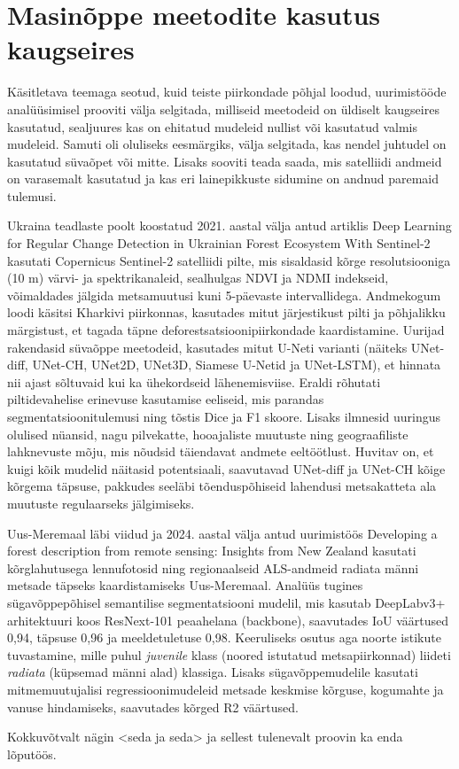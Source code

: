 \section{Masinõppe meetodite kasutus kaugseires}
Käsitletava teemaga seotud, kuid teiste piirkondade põhjal loodud, uurimistööde analüüsimisel prooviti välja selgitada, milliseid meetodeid on üldiselt kaugseires kasutatud, sealjuures kas on ehitatud mudeleid nullist või kasutatud
valmis mudeleid. Samuti oli oluliseks eesmärgiks, välja selgitada, kas nendel juhtudel on kasutatud süvaõpet või mitte. Lisaks sooviti teada saada, mis satelliidi andmeid on varasemalt kasutatud ja kas eri lainepikkuste sidumine on andnud paremaid tulemusi.

Ukraina teadlaste poolt koostatud 2021. aastal välja antud artiklis \glqq Deep Learning for Regular Change
Detection in Ukrainian Forest Ecosystem With Sentinel-2\grqq{} kasutati Copernicus Sentinel-2 satelliidi pilte, mis sisaldasid kõrge resolutsiooniga (10 m) värvi- ja spektrikanaleid, sealhulgas NDVI ja NDMI indekseid, võimaldades jälgida metsamuutusi kuni 5-päevaste intervallidega. Andmekogum loodi käsitsi Kharkivi piirkonnas, kasutades mitut järjestikust pilti ja põhjalikku märgistust, et tagada täpne deforestsatsioonipiirkondade kaardistamine. Uurijad rakendasid süvaõppe meetodeid, kasutades mitut U-Neti varianti (näiteks UNet-diff, UNet-CH, UNet2D, UNet3D, Siamese U-Netid ja UNet-LSTM), et hinnata nii ajast sõltuvaid kui ka ühekordseid lähenemisviise. Eraldi rõhutati piltidevahelise erinevuse kasutamise eeliseid, mis parandas segmentatsioonitulemusi ning tõstis Dice ja F1 skoore. Lisaks ilmnesid uuringus olulised nüansid, nagu pilvekatte, hooajaliste muutuste ning geograafiliste lahknevuste mõju, mis nõudsid täiendavat andmete eeltöötlust. Huvitav on, et kuigi kõik mudelid näitasid potentsiaali, saavutavad UNet-diff ja UNet-CH kõige kõrgema täpsuse, pakkudes seeläbi tõenduspõhiseid lahendusi metsakatteta ala muutuste regulaarseks jälgimiseks. \cite{isaienkovDeepLearningRegular2021}

Uus-Meremaal läbi viidud ja 2024. aastal välja antud uurimistöös \glqq Developing a forest description from remote sensing: Insights from
New Zealand\grqq{} kasutati kõrglahutusega lennufotosid ning regionaalseid ALS-andmeid radiata männi metsade täpseks kaardistamiseks Uus-Meremaal. Analüüs tugines sügavõppepõhisel semantilise segmentatsiooni mudelil, mis kasutab DeepLabv3+ arhitektuuri koos ResNext-101 peaahelana (backbone), saavutades IoU väärtused 0,94, täpsuse 0,96 ja meeldetuletuse 0,98. Keeruliseks osutus aga noorte istikute tuvastamine, mille puhul \textit{juvenile} klass (noored istutatud metsapiirkonnad) liideti \textit{radiata} (küpsemad männi alad) klassiga. Lisaks sügavõppemudelile kasutati mitmemuutujalisi regressioonimudeleid metsade keskmise kõrguse, kogumahte ja vanuse hindamiseks, saavutades kõrged R2 väärtused. \cite{pearseDevelopingForestDescription2025}



Kokkuvõtvalt nägin <seda ja seda> ja sellest tulenevalt proovin ka enda lõputöös. 
